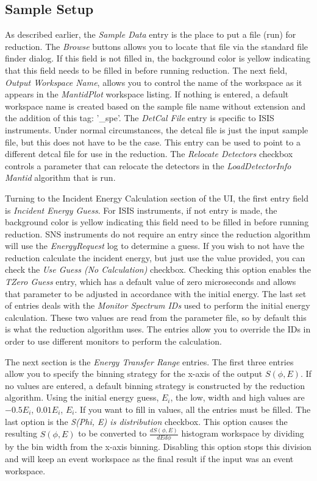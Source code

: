 \subsection{Sample Setup}
As described earlier, the \textit{Sample Data} entry is the place to put a file (run) for reduction. The \textit{Browse} buttons allows you to locate that file via the standard file finder dialog. If this field is not filled in, the background color is yellow indicating that this field needs to be filled in before running reduction. The next field, \textit{Output Workspace Name}, allows you to control the name of the workspace as it appears in the \textit{MantidPlot} workspace listing. If nothing is entered, a default workspace name is created based on the sample file name without extension and the addition of this tag: '\_spe'. The \textit{DetCal File} entry is specific to ISIS instruments. Under normal circumstances, the detcal file is just the input sample file, but this does not have to be the case. This entry can be used to point to a different detcal file for use in the reduction. The \textit{Relocate Detectors} checkbox controls a parameter that can relocate the detectors in the \textit{LoadDetectorInfo} \textit{Mantid} algorithm that is run. 

Turning to the Incident Energy Calculation section of the UI, the first entry field is \textit{Incident Energy Guess}. For ISIS instruments, if not entry is made, the background color is yellow indicating this field need to be filled in before running reduction. SNS instruments do not require an entry since the reduction algorithm will use the \textit{EnergyRequest} log to determine a guess. If you wish to not have the reduction calculate the incident energy, but just use the value provided, you can check the \textit{Use Guess (No Calculation)} checkbox. Checking this option enables the \textit{TZero Guess} entry, which has a default value of zero microseconds and allows that parameter to be adjusted in accordance with the initial energy. The last set of entries deals with the \textit{Monitor Spectrum IDs} used to perform the initial energy calculation. These two values are read from the parameter file, so by default this is what the reduction algorithm uses. The entries allow you to override the IDs in order to use different monitors to perform the calculation.

The next section is the \textit{Energy Transfer Range} entries. The first three entries allow you to specify the binning strategy for the x-axis of the output $S(\phi, E)$. If no values are entered, a default binning strategy is constructed by the reduction algorithm. Using the initial energy guess, $E_i$, the low, width and high values are $-0.5E_i$, $0.01E_i$, $E_i$. If you want to fill in values, all the entries must be filled. The last option is the \textit{S(Phi, E) is distribution} checkbox. This option causes the resulting $S(\phi, E)$ to be converted to $\frac{dS(\phi, E)}{dEd\phi}$ histogram workspace by dividing by the bin width from the x-axis binning. Disabling this option stops this division and will keep an event workspace as the final result if the input was an event workspace. 

